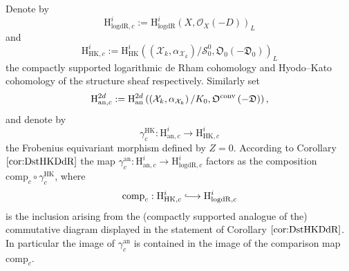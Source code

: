 \documentclass[asterisque,english]{smfart}
\newcommand{\lfre}[1]{\stackrel{#1}{\longrightarrow}}
\newcommand{\hlfre}[1]{\stackrel{#1}{\lhook\joinrel\relbar\joinrel\rightarrow}}
\begin{document}
Denote by 
\[
\mathrm{H}_{\mathrm{logdR},c}^{i}:=\mathrm{H}_{\mathrm{logdR}}^{i}\left( X,%
\mathcal{O}_{X}\left( -D\right) \right) _{L}
\]%
and 
\[
\mathrm{H}_{\mathrm{HK},c}^{i}:=\mathrm{H}_{\mathrm{HK}}^{i}\left( \left( 
\mathcal{X}_{k},\alpha _{\mathcal{X}_{k}}\right) /\mathcal{S}_{0}^{0},%
\mathfrak{O}_{0}\left( -\mathfrak{D}_{0}\right) \right) _{L}
\]
the compactly supported logarithmic de Rham cohomology and  Hyodo--Kato cohomology of the structure sheaf respectively. 
Similarly set 
\[
    \mathrm{H}_{%
\mathrm{an},c}^{2d}:=\mathrm{H}_{\mathrm{an}}^{2d}\left( \left( 
\mathcal{X}_{k},\alpha _{\mathcal{X}_{k}}\right) /K_{0},\mathfrak{O}^{%
\mathrm{conv}}\left( -\mathfrak{D}\right) \right),
\]
and denote by $$\gamma^{\mathrm{HK}}_{c} : \mathrm{H}_{\mathrm{an},c}^{i}\lfre{}\mathrm{H}^{i}_{\mathrm{HK},c}$$
the Frobenius equivariant morphism defined by $Z=0$. According to Corollary $\ref{cor:DstHKDdR}$
the map  $\gamma_{c}^{\mathrm{an}} : \mathrm{H}^{i}_{\mathrm{an},c}\lfre{}\mathrm{H}^{i}_{\mathrm{logdR},c}$
factors as the composition $\mathrm{comp}_{c}\circ{}\gamma^{\mathrm{HK}}_{c}$, where 
\[
       \mathrm{comp}_{c} : \mathrm{H}^{i}_{\mathrm{HK},c}\hlfre{}\mathrm{H}_{\mathrm{logdR},c}^{i}
\] 
is the inclusion arising from the (compactly supported analogue of the) commutative diagram displayed in the statement of Corollary $\ref{cor:DstHKDdR}$. In particular the image of $\gamma_{c}^{\mathrm{an}}$ is contained in 
the image of  the comparison map $\mathrm{comp}_{c}$.
\end{document}

